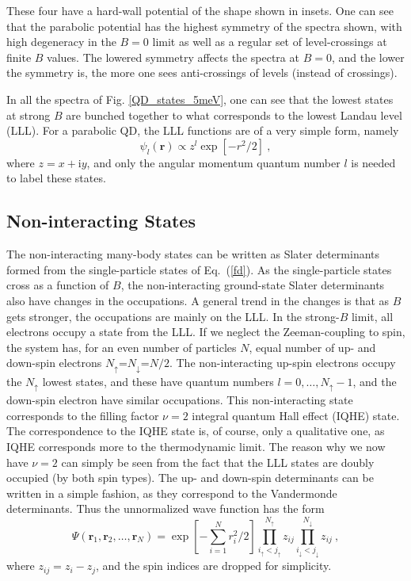 \documentclass{article}
\begin{document}
%
These four have a hard-wall potential of the shape shown in
insets. One can see that the parabolic potential has the highest
symmetry of the spectra shown, with high degeneracy in the $B=0$ limit
as well as a regular set of level-crossings at finite $B$ values. The
lowered symmetry affects the spectra at $B=0$, and the lower the
symmetry is, the more one sees anti-crossings of levels (instead of
crossings).

In all the spectra of Fig. \ref{QD_states_5meV}, one can see that the
lowest states at strong $B$ are bunched together to what corresponds
to the lowest Landau level (LLL). For a parabolic QD, the LLL
functions are of a very simple form, namely
\begin{equation}
\psi_{l}(\mathbf{r})\propto z^{l} \exp\left[-{ r^2}/{2}\right] \ ,
\end{equation}
where $z=x+{\mathrm i} y$, and only the angular momentum quantum
number $l$ is needed to label these states.


\subsection{Non-interacting States}

The non-interacting many-body states can be written as Slater
determinants formed from the single-particle states of
Eq.~(\ref{fd}). As the single-particle states cross as a function of
$B$, the non-interacting ground-state Slater determinants also have
changes in the occupations.  A general trend in the changes is that as
$B$ gets stronger, the occupations are mainly on the LLL. In the
strong-$B$ limit, all electrons occupy a state from the LLL. If we
neglect the Zeeman-coupling to spin, the system has, for an even
number of particles $N$, equal number of up- and down-spin electrons
$N_{\uparrow}$=$N_{\downarrow}$=$N/2$. The non-interacting up-spin
electrons occupy the $N_{\uparrow}$ lowest states, and these have
quantum numbers $l=0,\dots,N_{\uparrow}-1$, and the down-spin electron
have similar occupations. This non-interacting state corresponds to
the filling factor $\nu=2$ integral quantum Hall effect (IQHE)
state. The correspondence to the IQHE state is, of course, only a
qualitative one, as IQHE corresponds more to the thermodynamic
limit. The reason why we now have $\nu=2$ can simply be seen from the
fact that the LLL states are doubly occupied (by both spin types).
The up- and down-spin determinants can be written in a simple fashion,
as they correspond to the Vandermonde determinants. Thus the
unnormalized wave function has the form
\begin{equation}
\Psi(\mathbf{r}_1,\mathbf{r}_2,\dots,\mathbf{r}_N) =
\exp\left[-\sum_{i=1}^N r_i^2/2\right]
\prod_{i_{\uparrow}<j_{\uparrow}}^{N_{\uparrow}} z_{ij}
\prod_{i_{\downarrow}<j_{\downarrow}}^{N_{\downarrow}} z_{ij} \ ,
\label{lllwf}
\end{equation}
where $z_{ij}=z_i-z_j$, and the spin indices are dropped for simplicity.
\end{document}
